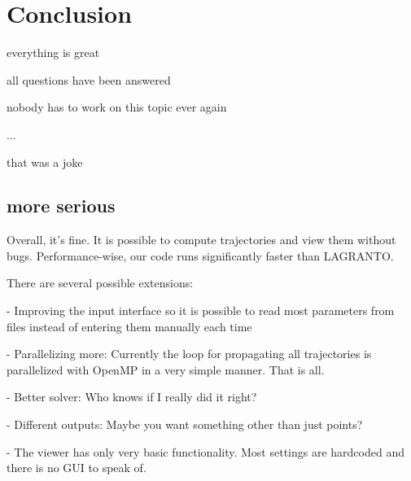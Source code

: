 \chapter{Conclusion}


everything is great

all questions have been answered

nobody has to work on this topic ever again

...

that was a joke

\section{more serious}
Overall, it's fine. It is possible to compute trajectories and view them without bugs. Performance-wise, our code runs significantly faster than LAGRANTO.

There are several possible extensions:

- Improving the input interface so it is possible to read most parameters from files instead of entering them manually each time

- Parallelizing more: Currently the loop for propagating all trajectories is parallelized with OpenMP in a very simple manner. That is all.

- Better solver: Who knows if I really did it right?

- Different outputs: Maybe you want something other than just points?

- The viewer has only very basic functionality. Most settings are hardcoded and there is no GUI to speak of.


